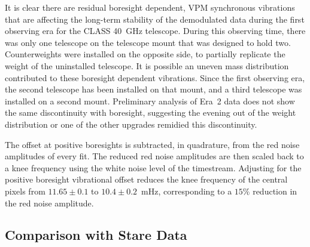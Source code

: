\documentclass[twocolumn, tighten, numberedappendix, twocolappendix]{aastex63}
\begin{document}

It is clear there are residual boresight dependent, VPM synchronous vibrations that are affecting the long-term stability of the demodulated data during the first observing era for the CLASS 40~GHz telescope. During this observing time, there was only one telescope on the telescope mount that was designed to hold two. Counterweights were installed on the opposite side, to partially replicate the weight of the uninstalled telescope. It is possible an uneven mass distribution contributed to these boresight dependent vibrations. Since the first observing era, the second telescope has been installed on that mount, and a third telescope was installed on a second mount. Preliminary analysis of Era~2 data does not show the same discontinuity with boresight, suggesting the evening out of the weight distribution or one of the other upgrades remidied this discontinuity.

The offset at positive boresights is subtracted, in quadrature, from the red noise amplitudes of every fit. The reduced red noise amplitudes are then scaled back to a knee frequency using the white noise level of the timestream. Adjusting for the positive boresight vibrational offset reduces the knee frequency of the central pixels from $11.65\pm0.1$ to $10.4\pm0.2$~mHz, corresponding to a $15\%$ reduction in the red noise amplitude. 

\subsection{Comparison with Stare Data}
\end{document}
